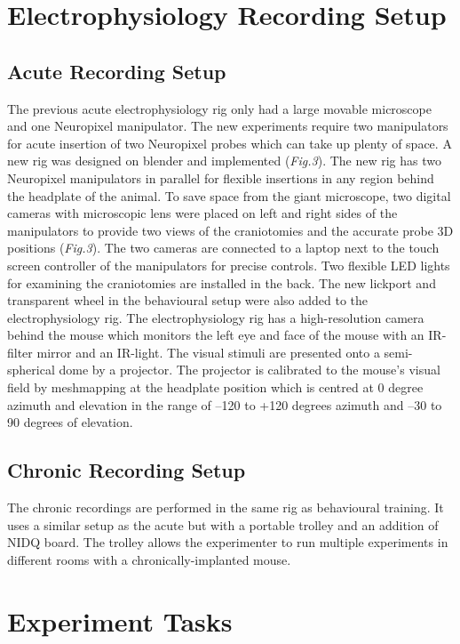 \section{Electrophysiology Recording Setup}
\subsection{Acute Recording Setup}
The previous acute electrophysiology rig only had a large movable microscope and one Neuropixel manipulator. The new experiments require two manipulators for acute insertion of two Neuropixel probes which can take up plenty of space. A new rig was designed on blender and implemented (\textit{Fig.3}). The new rig has two Neuropixel manipulators in parallel for flexible insertions in any region behind the headplate of the animal. To save space from the giant microscope, two digital cameras with microscopic lens were placed on left and right sides of the manipulators to provide two views of the craniotomies and the accurate probe 3D positions (\textit{Fig.3}). The two cameras are connected to a laptop next to the touch screen controller of the manipulators for precise controls. Two flexible LED lights for examining the craniotomies are installed in the back. The new lickport and transparent wheel in the behavioural setup were also added to the electrophysiology rig. The electrophysiology rig has a high-resolution camera behind the mouse which monitors the left eye and face of the mouse with an IR-filter mirror and an IR-light. The visual stimuli are presented onto a semi-spherical dome by a projector. The projector is calibrated to the mouse’s visual field by meshmapping at the headplate position which is centred at 0 degree azimuth and elevation in the range of –120 to +120 degrees azimuth and –30 to 90 degrees of elevation. 

\subsection{Chronic Recording Setup}
The chronic recordings are performed in the same rig as behavioural training. It uses a similar setup as the acute but with a portable trolley and an addition of NIDQ board. The trolley allows the experimenter to run multiple experiments in different rooms with a chronically-implanted mouse.

\section{Experiment Tasks}
